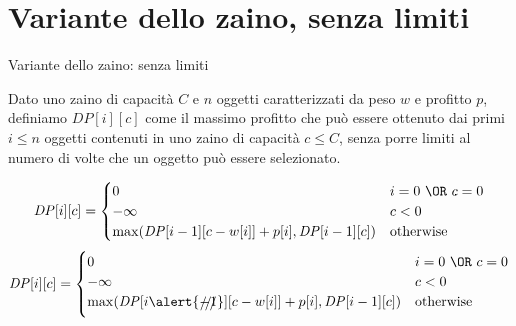 \section{Variante dello zaino, senza limiti}


\begin{frame}{Variante dello zaino: senza limiti}

\vspace{-9pt}
\begin{myboxtitle}
Dato uno zaino di capacità $C$ e $n$ oggetti caratterizzati
da peso $w$ e profitto $p$, definiamo $\mathit{DP}[i][c]$ come il
massimo profitto che può essere ottenuto dai primi $i \leq n$
oggetti contenuti in uno zaino di capacità $c \leq C$, \alert{senza porre
limiti al numero di volte che un oggetto può essere selezionato}.
\end{myboxtitle}


\small
\begin{overprint}
\[
\mathit{DP}[i][c] = \begin{cases}
  0 & i=0\ \OR\ c=0 \\
  -\infty & c < 0 \\
  \max( \mathit{DP}[i-1][c-w[i]] + p[i], \mathit{DP}[i-1][c] ) & \textrm{otherwise}
\end{cases}
\]
\[
\mathit{DP}[i][c] = \begin{cases}
  0 & i=0\ \OR\ c=0 \\
  -\infty & c < 0 \\
  \max( \mathit{DP}[i\alert{\xout{-1}}][c-w[i]] + p[i], \mathit{DP}[i-1][c] ) & \textrm{otherwise}
\end{cases}
\]
\end{overprint}

\end{frame}


